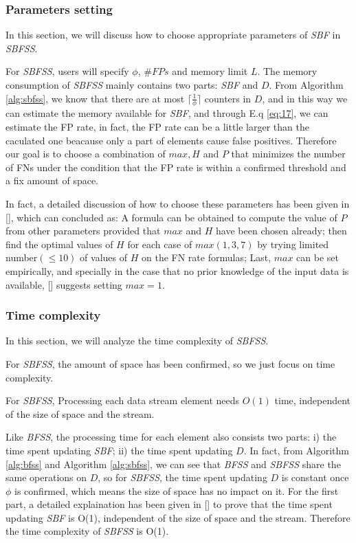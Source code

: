 \documentclass[conference]{IEEEtran}
\begin{document}
\subsubsection{\textbf{Parameters setting}}
In this section, we will discuss how to choose appropriate parameters of \emph{SBF} in \emph{SBFSS}.\par 
For \emph{SBFSS}, users will specify $\phi$, $\#FPs$ and memory limit $L$. The memory consumption of \emph{SBFSS} mainly contains two parts: \emph{SBF} and $D$. From Algorithm \ref{alg:sbfss}, we know that there are at most $\lceil\frac{1}{\phi}\rceil$ counters in $D$, and in this way we can estimate the memory available for \emph{SBF}, and through E.q \ref{eq:17}, we can estimate the FP rate, in fact, the FP rate can be a little larger than the caculated one beacause only a part of elements cause false positives. Therefore our goal is to choose a combination of $max,H$ and $P$ that minimizes the number of FNs under the condition that the FP rate is within a confirmed threshold and a fix amount of space.\par
In fact, a detailed discussion of how to choose these parameters has been given in [], which can concluded as: A formula can be obtained to compute the value of $P$ from other parameters provided that $max$ and $H$ have been chosen already; then find the optimal values of $H$ for each case of $max(1,3,7)$ by trying limited number$(\leq 10)$ of values of $H$ on the FN rate formulas; Last, $max$ can be set empirically, and specially in the case that no prior knowledge of the input data is available, [] suggests setting $max=1$.

\subsubsection{\textbf{Time complexity}}
In this section, we will analyze the time complexity of \emph{SBFSS}.\par
For \emph{SBFSS}, the amount of space has been confirmed, so we just focus on time complexity.

\begin{theorem}\label{thm:8}
For \emph{SBFSS}, Processing each data stream element needs $O(1)$ time, independent of the size of space and the stream.
\end{theorem}

\begin{IEEEproof}
Like \emph{BFSS}, the processing time for each element also consists two parts: i) the time spent updating \emph{SBF}; ii) the time spent updating $D$. In fact, from Algorithm \ref{alg:bfss} and Algorithm \ref{alg:sbfss}, we can see that \emph{BFSS} and \emph{SBFSS} share the same operations on $D$, so for \emph{SBFSS}, the time spent updating $D$ is constant once $\phi$ is confirmed, which means the size of space has no impact on it. For the first part, a detailed explaination has been given in [] to prove that the time spent updating \emph{SBF} is O(1), independent of the size of space and the stream. Therefore the time complexity of \emph{SBFSS} is O(1).
\end{IEEEproof}
\end{document}
